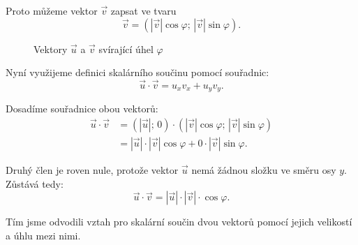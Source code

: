 \begin{example}



























Proto můžeme vektor $\vec{v}$ zapsat ve tvaru
\[
\vec{v} = (|\vec{v}|\cos\varphi;\, |\vec{v}|\sin\varphi).
\]

\begin{figure}[H]
    \centering
    \caption{Vektory $\vec{u}$ a $\vec{v}$ svírající úhel $\varphi$}
    \label{fig:dot_product_general_example}
\end{figure}

Nyní využijeme definici skalárního součinu pomocí souřadnic:
\[
\vec{u} \cdot \vec{v} = u_x v_x + u_y v_y.
\]

Dosadíme souřadnice obou vektorů:
\begin{align*}
\vec{u} \cdot \vec{v}
&= (|\vec{u}|;\,0) \cdot (|\vec{v}|\cos\varphi;\, |\vec{v}|\sin\varphi) \\
&= |\vec{u}| \cdot |\vec{v}|\cos\varphi + 0 \cdot |\vec{v}|\sin\varphi.
\end{align*}

Druhý člen je roven nule, protože vektor $\vec{u}$ nemá žádnou složku ve směru osy $y$. Zůstává tedy:
\[
\vec{u} \cdot \vec{v} = |\vec{u}| \cdot |\vec{v}| \cdot \cos\varphi.
\]

Tím jsme odvodili vztah pro skalární součin dvou vektorů pomocí jejich velikostí a úhlu mezi nimi.
\end{example}


